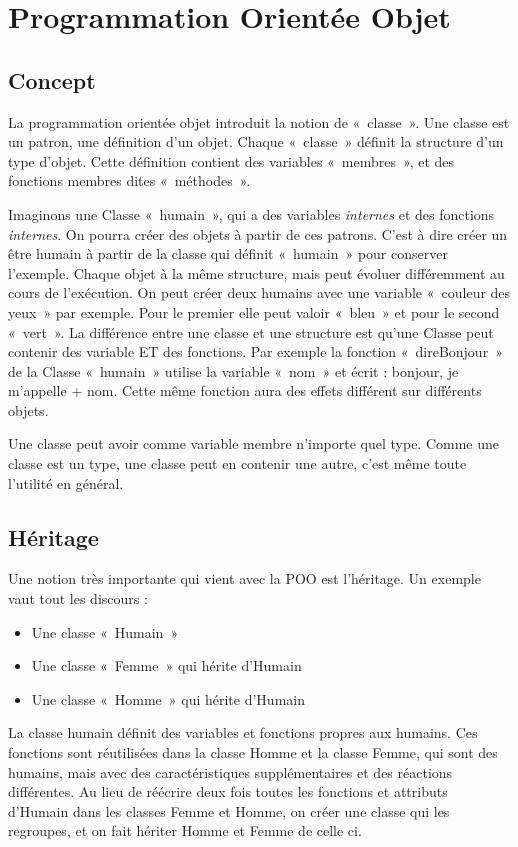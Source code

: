 \section{Programmation Orientée Objet}
  \label{DefPOO}
  \subsection{Concept}
    La programmation orientée objet introduit la notion de «~classe~». Une classe est 
    un patron, une définition d'un objet. Chaque «~classe~» définit la structure d'un type
    d'objet. Cette définition contient des variables «~membres~», et des fonctions membres dites «~méthodes~».
    
    Imaginons une Classe «~humain~», qui a des variables \textit{internes} et
    des fonctions \textit{internes}. On pourra créer des objets à partir de ces patrons. C'est à dire 
    créer un être humain à partir de la classe qui définit «~humain~» pour conserver l'exemple. Chaque objet 
    à la même structure, mais peut évoluer différemment au cours de l’exécution. On peut créer
    deux humains avec une variable «~couleur des yeux~» par exemple. Pour le premier elle peut valoir «~bleu~» et pour le second «~vert~». La différence entre une classe et une structure est qu'une Classe 
    peut contenir des variable ET des fonctions. Par exemple la fonction «~direBonjour~» de la 
    Classe «~humain~» utilise la variable «~nom~» et écrit : bonjour, je m'appelle + nom.
    Cette même fonction aura des effets différent sur différents objets.
    
    Une classe peut avoir comme variable membre n'importe quel type. Comme une classe est un type, une classe peut en contenir une autre, c'est même toute l'utilité en général.
  \subsection{Héritage}
    Une notion très importante qui vient avec la POO est l'héritage. Un exemple vaut tout les discours :
      \begin{itemize}
        \item Une classe «~Humain~»
        \item Une classe «~Femme~» qui hérite d'Humain
        \item Une classe «~Homme~» qui hérite d'Humain
      \end{itemize}
    
    La classe humain définit des variables et fonctions propres aux humains. Ces fonctions sont réutilisées dans la classe Homme et la classe Femme, qui sont des humains, mais avec des caractéristiques supplémentaires et des réactions différentes. Au lieu de réécrire deux fois toutes les fonctions et attributs d'Humain dans les classes Femme et Homme, on créer une classe qui les regroupes, et on fait hériter Homme et Femme de celle ci.
    
